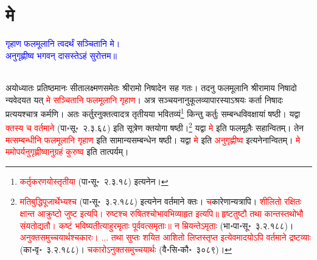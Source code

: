 \section[मे]{मे}
\centering\textcolor{blue}{गृहाण फलमूलानि त्वदर्थं सञ्चितानि मे।\nopagebreak\\
अनुगृह्णीष्व भगवन् दासस्तेऽहं सुरोत्तम॥}\nopagebreak\\
\\
\begin{sloppypar}\justifying\noindent\hspace{10mm} अयोध्यातः प्रतिष्ठमानः सीता\-लक्ष्मण\-समेतः श्रीरामो निषादेन सह गतः। तदनु फल\-मूलानि श्रीरामाय निषादो न्यवेदयत यत् \textcolor{red}{मे सञ्चितानि फलमूलानि गृहाण}। अत्र सञ्चयनानुकूल\-व्यापारस्याऽश्रयः कर्ता निषादः प्रत्ययश्चात्र कर्मणि। अतः कर्तुरनुक्तत्वादत्र तृतीयया भवितव्यं\footnote{\textcolor{red}{कर्तृ\-करणयोस्तृतीया} (पा॰सू॰~२.३.१८) इत्यनेन।} किन्तु कर्तुः सम्बन्ध\-विवक्षायां षष्ठी। यद्वा \textcolor{red}{क्तस्य च वर्तमाने} (पा॰सू॰~२.३.६८) इति सूत्रेण क्तयोगा षष्ठी।\footnote{\textcolor{red}{मति\-बुद्धि\-पूजार्थेभ्यश्च} (पा॰सू॰~३.२.१८८) इत्यनेन वर्तमाने क्तः। \textcolor{red}{च}\-कारेणान्यत्रापि। \textcolor{red}{शीलितो रक्षितः क्षान्त आक्रुष्टो जुष्ट इत्यपि। रुष्टश्च रुषितश्चोभावभिव्याहृत इत्यपि॥ हृष्टतुष्टौ तथा कान्तस्तथोभौ संयतोद्यतौ। कष्टं भविष्यतीत्याहुरमृताः पूर्ववत्समृताः॥ न म्रियन्तेऽमृताः} (भा॰पा॰सू॰~३.२.१८८)। \textcolor{red}{अनुक्तसमुच्चयार्थश्चकारः। ... तथा सुप्तः शयित आशितो लिप्तस्तृप्त इत्येवमादयोऽपि वर्तमाने द्रष्टव्याः} (का॰वृ॰~३.२.१८८)। \textcolor{red}{चकारोऽनुक्त\-समुच्चयार्थः} (वै॰सि॰कौ॰~३०८९)।} यद्वा \textcolor{red}{मे} इति फलमूलैः सहान्वितम्। तेन \textcolor{red}{मत्सम्बन्धीनि फल\-मूलानि गृहाण} इति सामान्य\-सम्बन्धेन षष्ठी। यद्वा \textcolor{red}{मे} इति \textcolor{red}{अनुगृह्णीष्व} इत्यनेनान्वितम्। \textcolor{red}{मे ममोपर्यनुगृह्णीष्वानुग्रहं कुरुष्व} इति तात्पर्यम्।\end{sloppypar}
